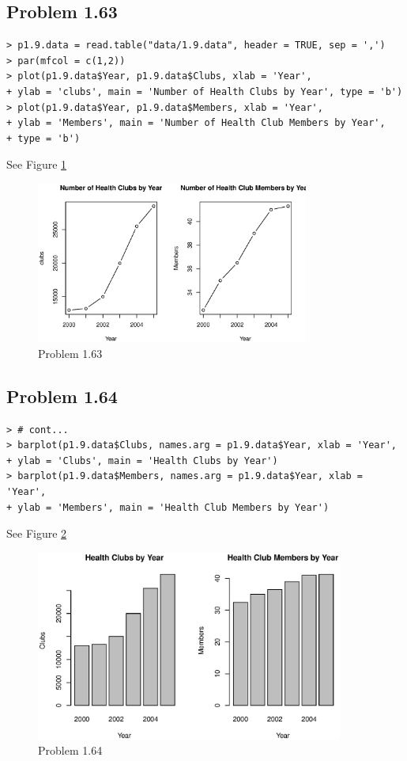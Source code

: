 
\subsection{Problem 1.63}
\begin{lstlisting}
> p1.9.data = read.table("data/1.9.data", header = TRUE, sep = ',')
> par(mfcol = c(1,2))
> plot(p1.9.data$Year, p1.9.data$Clubs, xlab = 'Year', 
+ ylab = 'clubs', main = 'Number of Health Clubs by Year', type = 'b')
> plot(p1.9.data$Year, p1.9.data$Members, xlab = 'Year', 
+ ylab = 'Members', main = 'Number of Health Club Members by Year',
+ type = 'b')
\end{lstlisting}
	See Figure \ref{p1.63}
	\begin{figure}[!htb]
	  \centering
	  \includegraphics[width=0.8\textwidth]{p1.63.eps}
	  \caption{Problem 1.63 \label{p1.63}}
	\end{figure}
	
\clearpage

\subsection{Problem 1.64}
\begin{lstlisting}
> # cont...
> barplot(p1.9.data$Clubs, names.arg = p1.9.data$Year, xlab = 'Year', 
+ ylab = 'Clubs', main = 'Health Clubs by Year')
> barplot(p1.9.data$Members, names.arg = p1.9.data$Year, xlab = 'Year', 
+ ylab = 'Members', main = 'Health Club Members by Year')
\end{lstlisting}
	See Figure \ref{p1.64}
	\begin{figure}[!htb]
	  \centering
	  \includegraphics[width=0.9\textwidth]{p1.64.eps}
	  \caption{Problem 1.64 \label{p1.64}}
	\end{figure}

